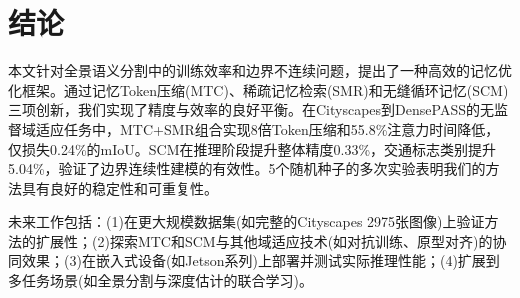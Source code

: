 \section{结论}
\label{sec:conclusion}

本文针对全景语义分割中的训练效率和边界不连续问题，提出了一种高效的记忆优化框架。通过记忆Token压缩(MTC)、稀疏记忆检索(SMR)和无缝循环记忆(SCM)三项创新，我们实现了精度与效率的良好平衡。在Cityscapes到DensePASS的无监督域适应任务中，MTC+SMR组合实现8倍Token压缩和55.8\%注意力时间降低，仅损失0.24\%的mIoU。SCM在推理阶段提升整体精度0.33\%，交通标志类别提升5.04\%，验证了边界连续性建模的有效性。5个随机种子的多次实验表明我们的方法具有良好的稳定性和可重复性。

未来工作包括：(1)在更大规模数据集(如完整的Cityscapes 2975张图像)上验证方法的扩展性；(2)探索MTC和SCM与其他域适应技术(如对抗训练、原型对齐)的协同效果；(3)在嵌入式设备(如Jetson系列)上部署并测试实际推理性能；(4)扩展到多任务场景(如全景分割与深度估计的联合学习)。

